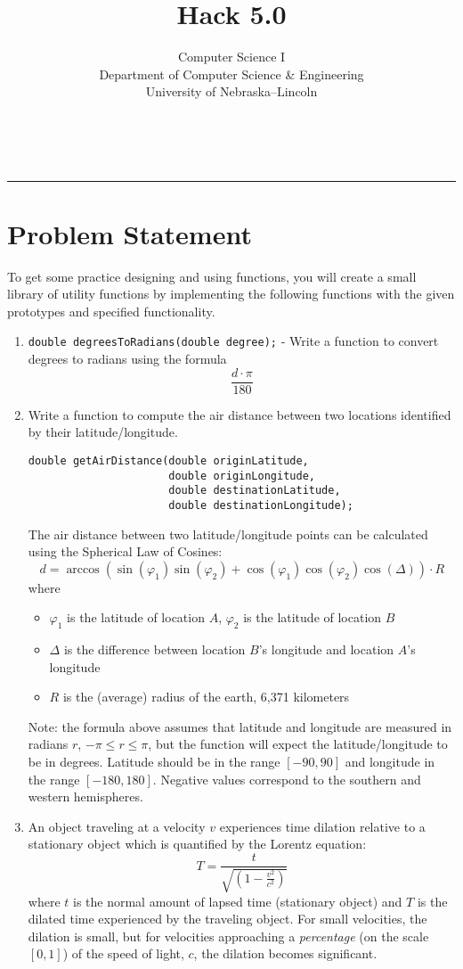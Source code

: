 \documentclass[12pt]{scrartcl}
\title{Hack 5.0}\let\Title\@title
\subtitle{Computer Science I\\
{\small
\vskip1cm
Department of Computer Science \& Engineering \\
University of Nebraska--Lincoln}
\vskip-1cm}
\date{~}
\begin{document}
\maketitle

\hrule



\section*{Problem Statement}

To get some practice designing and using functions, you will 
create a small library of utility functions by implementing
the following functions with the given prototypes and specified 
functionality.
\begin{enumerate}
  \item \texttt{double degreesToRadians(double degree);} - Write a 
  	function to convert degrees to radians using the formula 
		$$\frac{d\cdot \pi}{180}$$
  \item Write a function to compute the air distance between two locations 
    identified by their latitude/longitude.  
\begin{verbatim}
double getAirDistance(double originLatitude, 
                      double originLongitude, 
                      double destinationLatitude, 
                      double destinationLongitude);
\end{verbatim}  
The air distance between two latitude/longitude points can be calculated 
using the Spherical Law of Cosines:
 $$d = \arccos{(\sin(\varphi_1) \sin(\varphi_2) + \cos(\varphi_1) \cos(\varphi_2) \cos(\Delta) )} \cdot R$$
where
\begin{itemize}
  \item $\varphi_1$ is the latitude of location $A$, $\varphi_2$ is the latitude of location $B$
  \item $\Delta$ is the difference between location $B$'s longitude and location $A$'s longitude
  \item $R$ is the (average) radius of the earth, 6,371 kilometers
\end{itemize}
Note: the formula above assumes that latitude and longitude are measured 
in radians $r$, $-\pi \leq r \leq \pi$, but the function will expect 
the latitude/longitude to be in degrees.  Latitude should be in the range 
$[-90, 90]$ and longitude in the range $[-180, 180]$.  Negative values 
correspond to the southern and western hemispheres.

\newpage
  \item An object traveling at a velocity $v$ experiences time dilation
  relative to a stationary object which is quantified by the Lorentz equation:
  $$T = \frac{t}{\sqrt{(1-\frac{v^2}{c^2})}}$$
  where $t$ is the normal amount of lapsed time (stationary object) 
  and $T$ is the dilated time experienced by the traveling object.  
  For small velocities, the dilation is small, but for velocities
  approaching a \emph{percentage} (on the scale $[0, 1]$) of the 
  speed of light, $c$, the dilation becomes significant.
  

\end{enumerate}
\end{document}
